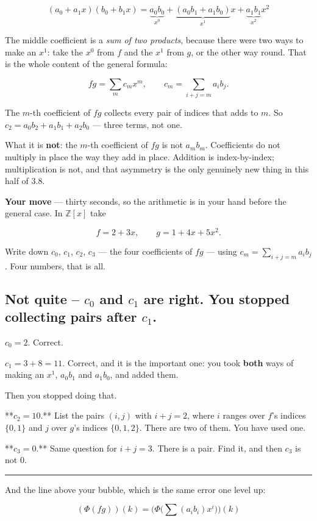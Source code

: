 \documentclass[11pt]{article}
\begin{document}
$$(a_0 + a_1x)(b_0 + b_1x) = \underbrace{a_0b_0}_{x^0} + \underbrace{(a_0b_1 + a_1b_0)}_{x^1}x + \underbrace{a_1b_1}_{x^2}x^2$$

The middle coefficient is a \emph{sum of two products}, because there were two ways
to make an $x^1$: take the $x^0$ from $f$ and the $x^1$ from $g$, or the other
way round. That is the whole content of the general formula:

$$fg = \sum_m c_m x^m, \qquad c_m = \sum_{i+j=m} a_ib_j.$$

The $m$-th coefficient of $fg$ collects every pair of indices that adds to $m$.
So $c_2 = a_0b_2 + a_1b_1 + a_2b_0$ --- three terms, not one.

What it is \textbf{not}: the $m$-th coefficient of $fg$ is not $a_mb_m$. Coefficients
do not multiply in place the way they add in place. Addition is index-by-index;
multiplication is not, and that asymmetry is the only genuinely new thing in
this half of 3.8.

\textbf{Your move} --- thirty seconds, so the arithmetic is in your hand before the
general case. In $\mathbb{Z}[x]$ take

$$f = 2 + 3x, \qquad g = 1 + 4x + 5x^2.$$

Write down $c_0$, $c_1$, $c_2$, $c_3$ --- the four coefficients of $fg$ --- using
$c_m = \sum_{i+j=m} a_ib_j$. Four numbers, that is all.


\subsection*{Not quite -- $c_0$ and $c_1$ are right. You stopped collecting pairs after $c_1$.}
$c_0 = 2$. Correct.

$c_1 = 3 + 8 = 11$. Correct, and it is the important one: you took \textbf{both}
ways of making an $x^1$, $a_0b_1$ and $a_1b_0$, and added them.

Then you stopped doing that.

**$c_2 = 10$.** List the pairs $(i,j)$ with $i + j = 2$, where $i$ ranges over
$f$'s indices $\{0,1\}$ and $j$ over $g$'s indices $\{0,1,2\}$. There are two of
them. You have used one.

**$c_3 = 0$.** Same question for $i + j = 3$. There is a pair. Find it, and
then $c_3$ is not $0$.

\medskip\hrule\medskip

And the line above your bubble, which is the same error one level up:

$$(\Phi(fg))(k) = \Big(\Phi\big(\textstyle\sum (a_i b_i)x^i\big)\Big)(k)$$
\end{document}
